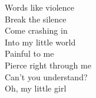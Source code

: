 Words like violence \\
Break the silence \\
Come crashing in \\
Into my little world \\

Painful to me \\
Pierce right through me \\
Can't you understand? \\
Oh, my little girl \\

%
%
%
